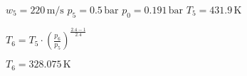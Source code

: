 \( w_5 = 220 \, \text{m/s} \)  
\( p_5 = 0.5 \, \text{bar} \)  
\( p_0 = 0.191 \, \text{bar} \)  
\( T_5 = 431.9 \, \text{K} \)  

\( T_6 = T_5 \cdot \left( \frac{p_6}{p_5} \right)^{\frac{2.4 - 1}{2.4}} \)  

\( T_6 = 328.075 \, \text{K} \)